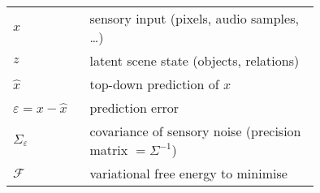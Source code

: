 \begin{center}
\begin{tabular}{lp{0.75\linewidth}}
$x$                     & sensory input (pixels, audio samples, …)\\
$z$                     & latent scene state (objects, relations)\\
$\hat{x}$               & top-down prediction of $x$\\
$\varepsilon = x-\hat{x}$ & prediction error\\
$\Sigma_{\varepsilon}$  & covariance of sensory noise (precision matrix $=\Sigma^{-1}$)\\
$\mathcal{F}$           & variational free energy to minimise\\
\end{tabular}
\end{center}

